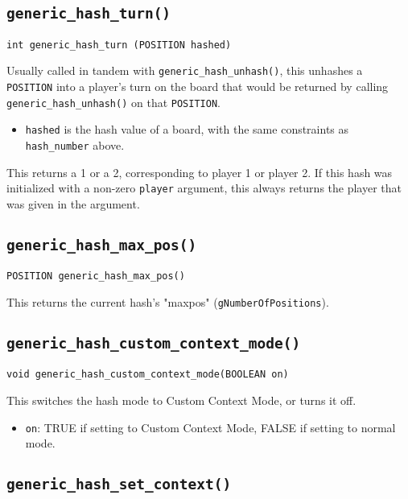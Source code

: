 \documentclass[11pt]{article}
\begin{document}
\subsection{\texttt{generic\_hash\_turn()}}

\texttt{int generic\_hash\_turn (POSITION hashed)}

Usually called in tandem with \texttt{generic\_hash\_unhash()}, this unhashes a \texttt{POSITION} into a player's turn on the board that would be returned by calling \texttt{generic\_hash\_unhash()} on that \texttt{POSITION}.

\begin{itemize}
\item \texttt{hashed} is the hash value of a board, with the same constraints as \texttt{hash\_number} above.
\end{itemize}

This returns a 1 or a 2, corresponding to player 1 or player 2.
If this hash was initialized with a non-zero \texttt{player} argument, this always returns the player that was given in the argument. 


\subsection{\texttt{generic\_hash\_max\_pos()}}

\texttt{POSITION generic\_hash\_max\_pos()}

This returns the current hash's "maxpos" (\texttt{gNumberOfPositions}).


\subsection{\texttt{generic\_hash\_custom\_context\_mode()}}

\texttt{void generic\_hash\_custom\_context\_mode(BOOLEAN on)}

This switches the hash mode to Custom Context Mode, or turns it off.

\begin{itemize}
\item \texttt{on}: TRUE if setting to Custom Context Mode, FALSE if setting to normal mode.
\end{itemize}


\subsection{\texttt{generic\_hash\_set\_context()}}
\end{document}
